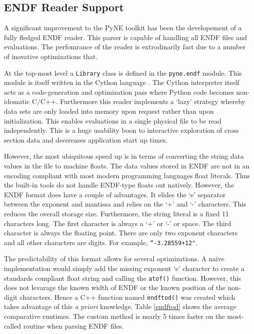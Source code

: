 \documentclass{ansconf}
\begin{document}
\subsection{ENDF Reader Support}

A significant improvement to the PyNE toolkit has been the developement of 
a fully fledged ENDF \cite{mclane2001endf} reader.  This parser is capable 
of handling all ENDF files and evaluations. The perfomrance of the reader is 
extrodinarily fast due to a number of inovative optimizations that.

At the top-most level a \texttt{Library} class is defined in the \texttt{pyne.endf}
module.  This module is itself written in the Cython language \cite{behnel2010cython}.
The Cython interpreter itself acts as a code-generation and optimization pass where
Python code becomes non-idomatic C/C++.  Furthermore this reader implements a
`lazy' strategy whereby data sets are only loaded into memory upon request rather 
than upon initialization.  This enables evaluations in a single physical file to be 
read independently.  This is a huge usability boon to interactive exploration of 
cross section data and decsreases application start up times.

However, the most ubiquitous speed up is in terms of converting the string
data values in the file to machine floats.  The data values stored in ENDF 
are not in an encoding compliant with
most modern programming languages float literals. Thus the built-in tools do not 
handle ENDF-type floats out natively.  However, the ENDF format does have a couple
of advantages.  It elides the `e' separator between the exponent and mantissa and
relies on the `+' and `-' characters.  This reduces the overall storage size.
Furthermore, the string literal is a fixed 11 characters long. The first character
is always a `+' or `-' or space.  The third character is always the floating point.
There are only two exponent characters and all other characters are digits.  
For example, \texttt{``-3.28559+12"}.

The predictability of this format allows for several optimizations.  A na\"{i}ve 
implementation would simply add the missing exponent `e' character to create
a standards compliant float string and calling the \texttt{atof()} function.  
However, this does not levarage the known width of ENDF or the known position of
the non-digit characters.  Hence a C++ function named \texttt{endftod()} was 
created which takes advantage of this \emph{a priori} knowledge.  Table \ref{endftod}
shows the average comparative runtimes. The custom method is nearly 
5 times faster on the most-called routine when parsing ENDF files.
\end{document}
